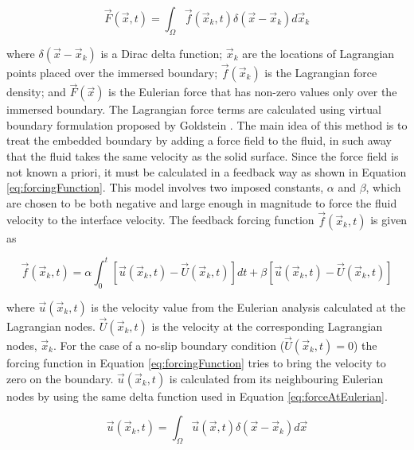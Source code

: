 \documentclass[12pt]{aiaa-pretty}
\begin{document}
%
\begin{equation}\label{eq:forceAtEulerian}
	\vec{F}(\vec{x}, t) = \int_\Omega \vec{f} (\vec{x}_k, t) \delta(\vec{x} - \vec{x}_k) d\vec{x}_k
\end{equation}
%

where $\delta(\vec{x} - \vec{x}_k)$ is a Dirac delta function; $\vec{x}_k$ are the locations of Lagrangian points placed over the immersed boundary; $\vec{f}(\vec{x}_k)$ is the Lagrangian force density; and $\vec{F}(\vec{x})$ is the Eulerian force that has non-zero values only over the immersed boundary. The Lagrangian force terms are calculated using virtual boundary formulation proposed by Goldstein \cite{goldstein1993modeling}. The main idea of this method is to treat the embedded boundary by adding a force field to the fluid, in such away that the fluid takes the same velocity as the solid surface. Since the force field is not known a priori, it must be calculated in a feedback way as shown in Equation \eqref{eq:forcingFunction}. This model involves two imposed constants, $\alpha$ and $\beta$, which are chosen to be both negative and large enough in magnitude to force the fluid velocity to the interface velocity. The feedback forcing function $\vec{f}(\vec{x}_k, t)$ is given as

%
\begin{equation}\label{eq:forcingFunction}
	\vec{f}\left( \vec{x}_k, t \right) = 
	\alpha \int_0^t \left[ \vec{u}\left( \vec{x}_k, t \right) - \vec{U}\left( \vec{x}_k, t \right) \right]dt + 
	\beta \left[ \vec{u}\left( \vec{x}_k, t \right) - \vec{U}\left( \vec{x}_k, t \right) \right]
\end{equation}
%

where $\vec{u}\left( \vec{x}_k, t \right)$ is the velocity value from the Eulerian analysis calculated at the Lagrangian nodes. $\vec{U}\left( \vec{x}_k, t \right)$ is the velocity at the corresponding Lagrangian nodes, $\vec{x}_k$. For the case of a no-slip boundary condition ($\vec{U}\left( \vec{x}_k, t \right) = 0 $) the forcing function in Equation \eqref{eq:forcingFunction} tries to bring the velocity to zero on the boundary. $\vec{u}\left( \vec{x}_k, t \right)$ is calculated from its neighbouring Eulerian nodes by using the same delta function used in Equation \eqref{eq:forceAtEulerian}.

%
\begin{equation}\label{eq:velocityAtLagrangian}
	\vec{u}(\vec{x}_k, t) = \int_\Omega \vec{u} (\vec{x}, t) \delta(\vec{x} - \vec{x}_k) d\vec{x}
\end{equation}
%
\end{document}
